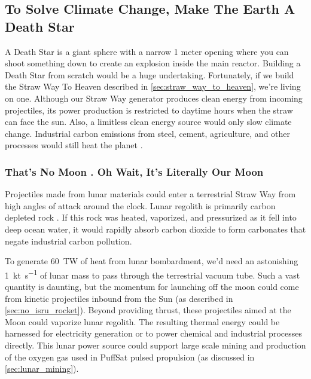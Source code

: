 \documentclass{article}
\begin{document}
\subsection{To Solve Climate Change, Make The Earth A Death Star}\label{sec:death_star}
A Death Star \cite{death_star} is a giant sphere with a  narrow 1 meter opening where you can shoot something down to create an explosion inside the main reactor.   Building a Death Star from scratch  would be a huge undertaking.   Fortunately, if we build the Straw Way To Heaven described in \autoref{sec:straw_way_to_heaven}, we're living on one.  Although our Straw Way generator produces clean energy from incoming projectiles, its power production is restricted to daytime hours when the straw can face the sun.   Also, a limitless clean energy source would only slow climate change.   Industrial carbon emissions from steel, cement, agriculture, and other processes would still heat the planet \cite{steel_and_cement}.   

\subsubsection{That's No Moon \cite{kenobi1977moon}.  Oh Wait, It's Literally Our Moon}
Projectiles made from lunar materials could enter a terrestrial Straw Way from high angles of attack around the clock.  Lunar regolith is primarily carbon depleted rock \cite{mckay1991lunar}.  If this rock was heated, vaporized, and pressurized as it fell into deep ocean water, it would rapidly absorb carbon dioxide to form carbonates that  negate industrial carbon pollution.

To generate \SI{60}{\tera\watt} of heat from lunar bombardment, we'd need an astonishing \SI{1}{\kilo\tonne\per\second} of lunar mass to pass through the terrestrial vacuum tube. Such a vast quantity is daunting, but the momentum for launching off the moon could come from kinetic projectiles inbound from the Sun (as described in \autoref{sec:no_isru_rocket}). Beyond providing thrust, these projectiles aimed at the Moon could vaporize lunar regolith. The resulting thermal energy could be harnessed for electricity generation or to power chemical and industrial processes directly. This lunar power source could support large scale mining and production of the oxygen gas used in PuffSat pulsed propulsion  (as discussed in \autoref{sec:lunar_mining}).
\end{document}
